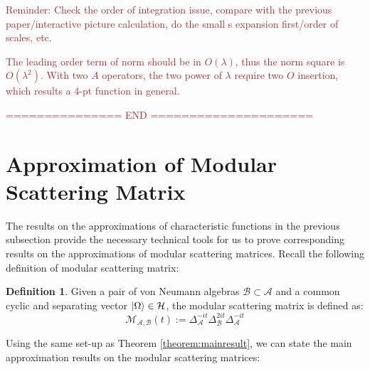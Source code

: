 \documentclass[a4paper,11pt]{article}
\theoremstyle{definition}
\newtheorem{definition}{Definition}[section]
\newcommand{\KL}[1]{\textcolor{brown}{#1}}
\begin{document}
\KL{Reminder: Check the order of integration issue, compare with the previous paper/interactive picture calculation, do the small s expansion first/order of scales, etc.}

\KL{The leading order term of norm should be in $O(\lambda)$, thus the norm square is $O(\lambda^2)$. With two $A$ operators, the two power of $\lambda$ require two $O$ insertion, which results a 4-pt function in general.}

\KL{=============== END =====================}

\section{Approximation of Modular Scattering Matrix}\label{app:modularSmatrix}

The results on the approximations of characteristic functions in the previous subsection provide the necessary technical tools for us to prove corresponding results on the approximations of modular scattering matrices. Recall the following definition of modular scattering matrix:
\begin{definition}
    Given a pair of von Neumann algebras $\mathcal{B}\subset\mathcal{A}$ and a common cyclic and separating vector $\ket{\Omega}\in\mathcal{H}$, the modular scattering matrix is defined as:
    \begin{equation}
        \mathcal{M}_{\mathcal{A},\mathcal{B}}(t):=\Delta_\mathcal{A}^{-it}\Delta_\mathcal{B}^{2it}\Delta_\mathcal{A}^{-it}
    \end{equation}
\end{definition}
Using the same set-up as Theorem \ref{theorem:mainresult}, we can state the main approximation results on the modular scattering matrices:
\end{document}
